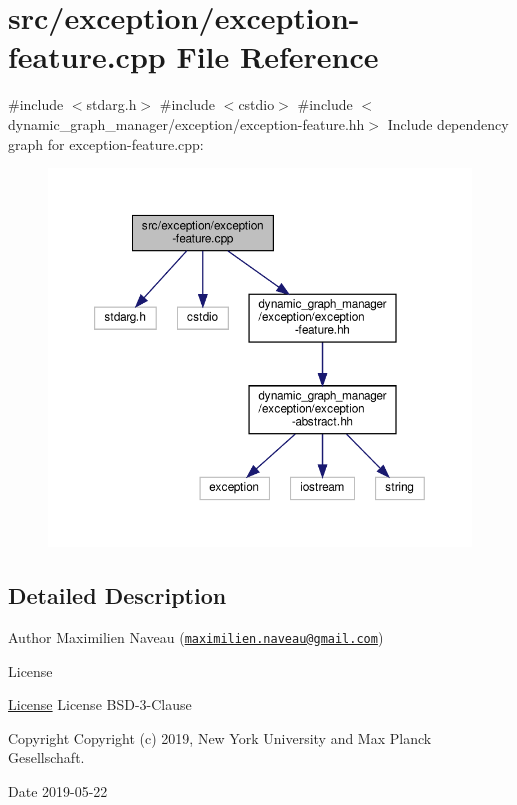 \hypertarget{exception-feature_8cpp}{}\section{src/exception/exception-\/feature.cpp File Reference}
\label{exception-feature_8cpp}
{\ttfamily \#include $<$stdarg.\+h$>$}\newline
{\ttfamily \#include $<$cstdio$>$}\newline
{\ttfamily \#include $<$dynamic\+\_\+graph\+\_\+manager/exception/exception-\/feature.\+hh$>$}\newline
Include dependency graph for exception-\/feature.cpp\+:
\nopagebreak
\begin{figure}[H]
\begin{center}
\leavevmode
\includegraphics[width=350pt]{exception-feature_8cpp__incl}
\end{center}
\end{figure}


\subsection{Detailed Description}
\begin{DoxyAuthor}{Author}
Maximilien Naveau (\href{mailto:maximilien.naveau@gmail.com}{\tt maximilien.\+naveau@gmail.\+com}) 
\end{DoxyAuthor}
\begin{DoxyRefDesc}{License}
\item[\hyperlink{license__license000047}{License}]License B\+S\+D-\/3-\/\+Clause \end{DoxyRefDesc}
\begin{DoxyCopyright}{Copyright}
Copyright (c) 2019, New York University and Max Planck Gesellschaft. 
\end{DoxyCopyright}
\begin{DoxyDate}{Date}
2019-\/05-\/22 
\end{DoxyDate}
